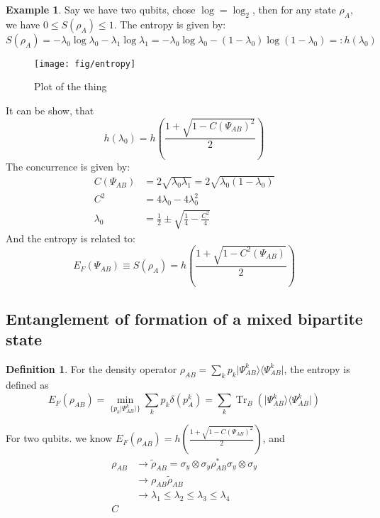 \documentclass[12pt]{book}
\theoremstyle{definition}
\newtheorem*{defi}{\bfseries Definition}
\newtheorem*{example}{\bfseries Example}
\newcommand{\de}{\delta}
\let\oldsum\sum
\renewcommand{\sum}[2]{\oldsum\limits_{#1}^{#2}}
\renewcommand{\to}{\longrightarrow}
\newcommand{\si}{\sigma}
\newcommand{\para}[1]{\left( {#1} \right)}
\newcommand{\bra}[1]{\langle {#1} \vert}
\newcommand{\ket}[1]{\vert {#1} \rangle}
\DeclareMathOperator{\tr}{Tr}
\begin{document}
\begin{example}
  Say we have two qubits, chose $\log = \log_2$, then for any state $\rho_A$, we have $0 \leq S(\rho_A) \leq 1$. The entropy is given by:
  \begin{equation*}
    S(\rho_A) = - \lambda_0 \log \lambda_0 - \lambda_1 \log \lambda_1 = - \lambda_0 \log \lambda_0 - (1 - \lambda_0) \log (1 - \lambda_0) =: h(\lambda_0)
  \end{equation*}
  \begin{figure}[h!]
    \centering
    \texttt{[image: fig/entropy]}
    \caption{Plot of the thing}
  \end{figure}
  \newpage
  It can be show, that
  \begin{equation}
    h(\lambda_0) = h \para{\frac{1 + \sqrt{1 - C(\Psi_{AB})^2}}{2}}
  \end{equation}
  The concurrence is given by:
  \begin{align*}
    C(\Psi_{AB}) & = 2 \sqrt{\lambda_0\lambda_1} = 2 \sqrt{\lambda_0 (1 - \lambda_0)} \\
    C^2  & = 4 \lambda_0 - 4 \lambda_0^2 \\
    \lambda_0 & = \frac{1}{2} \pm \sqrt{\frac{1}{4} - \frac{C^2}{4}}
  \end{align*}
  And the entropy is related to:
  \begin{equation}
    E_F (\Psi_{AB}) \equiv S(\rho_A) = h \para{\frac{1 + \sqrt{1 - C^2(\Psi_{AB})}}{2}}
  \end{equation}
\end{example}

\subsection{Entanglement of formation of a mixed bipartite state}

\begin{defi}
  For the density operator $\rho_{AB} = \sum{k}{} p_k \ket{\Psi_{AB}^k} \bra{\Psi_{AB}^k}$, the entropy is defined as
  \begin{equation}
    E_F(\rho_{AB}) = \min_{\{p_k \ket{\Psi_{AB}^k}\}} \sum{k}{} p_k \de(p_A^k) = \sum{k}{} \tr_B(\ket{\Psi_{AB}^k} \bra{\Psi_{AB}^k})
  \end{equation}
\end{defi}
For two qubits. we know $E_F(\rho_{AB}) = h \para{\frac{1 + \sqrt{1 - C(\Psi_{AB})^2}}{2}}$, and
\begin{align*}
  \rho_{AB} & \to \tilde \rho_{AB} = \si_y \otimes \si_y \rho_{AB}^* \si_y \otimes \si_y \\
  & \to \rho_{AB} \tilde \rho_{AB} \\
  & \to \lambda_1 \leq \lambda_2 \leq \lambda_3 \leq \lambda_4 \\
  C
\end{align*}
\end{document}
